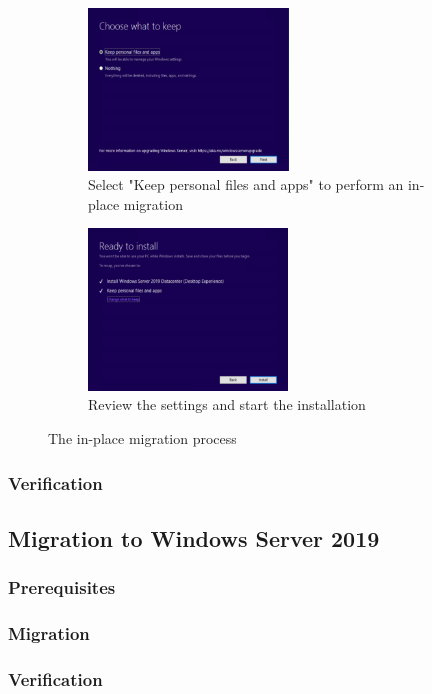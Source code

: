 \begin{figure}[h]\ContinuedFloat
	\begin{subfigure}{0.5\textwidth}
		\captionsetup{width=0.8\linewidth}
		\includegraphics[width=0.9\linewidth,height=4.3cm]{img/In-Place_WS_6.png} 
		\centering
		\caption{Select "Keep personal files and apps" to perform an in-place migration}
		\label{fig:inplace6}
	\end{subfigure}
	\begin{subfigure}{0.5\textwidth}
		\captionsetup{width=0.8\linewidth}
		\includegraphics[width=0.9\linewidth,height=4.3cm]{img/In-Place_WS_7.png}
		\centering
		\caption{Review the settings and start the installation}
		\label{fig:inplace7}
	\end{subfigure}
	\caption{The in-place migration process}
	\label{fig:inplace}
\end{figure}
\subsubsection{Verification}
\subsection{Migration to Windows Server 2019}
\subsubsection{Prerequisites}
\subsubsection{Migration}
\subsubsection{Verification}
